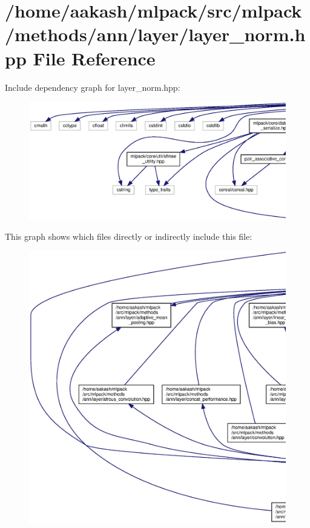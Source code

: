 \section{/home/aakash/mlpack/src/mlpack/methods/ann/layer/layer\+\_\+norm.hpp File Reference}
\label{layer__norm_8hpp}
Include dependency graph for layer\+\_\+norm.\+hpp\+:
\nopagebreak
\begin{figure}[H]
\begin{center}
\leavevmode
\includegraphics[width=350pt]{layer__norm_8hpp__incl}
\end{center}
\end{figure}
This graph shows which files directly or indirectly include this file\+:
\nopagebreak
\begin{figure}[H]
\begin{center}
\leavevmode
\includegraphics[width=350pt]{layer__norm_8hpp__dep__incl}
\end{center}
\end{figure}
